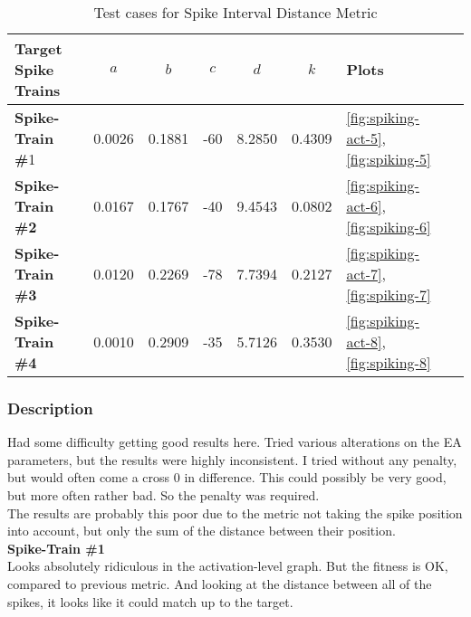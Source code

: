 \begin{table}[H]
	\begin{center}
		\begin{tabular}{ | l | c | c | c | c | c | l | l |}
	
	    \hline

			\textbf{Target Spike Trains} & \textbf{$a$} & \textbf{$b$} & \textbf{$c$} & \textbf{$d$} & \textbf{$k$} & \textbf{Plots}  \\ \hline 
			\textbf{Spike-Train \#}1 & 0.0026 & 0.1881 & -60 & 8.2850 & 0.4309 & \autoref{fig:spiking-act-5}, \autoref{fig:spiking-5} \\ \hline 
			\textbf{Spike-Train \#2} & 0.0167 & 0.1767 & -40 & 9.4543 & 0.0802 & \autoref{fig:spiking-act-6}, \autoref{fig:spiking-6} \\ \hline 
			\textbf{Spike-Train \#3} & 0.0120 & 0.2269 & -78 & 7.7394 & 0.2127 & \autoref{fig:spiking-act-7}, \autoref{fig:spiking-7} \\ \hline 
			\textbf{Spike-Train \#4} & 0.0010 & 0.2909 & -35 & 5.7126 & 0.3530 & \autoref{fig:spiking-act-8}, \autoref{fig:spiking-8}    \\ \hline 

	    \end{tabular}
	
	\end{center}
    \caption{Test cases for Spike Interval Distance Metric}
\end{table}

\subsubsection{Description}

Had some difficulty getting good results here. Tried various alterations on the EA parameters,
but the results were highly inconsistent. I tried without any penalty, but would often come
a cross 0 in difference. This could possibly be very good, but more often rather bad. So the penalty
was required. \\

The results are probably this poor due to the metric not taking the spike position into account, but
only the sum of the distance between their position. \\

\textbf{Spike-Train \#1} \\
Looks absolutely ridiculous in the activation-level graph. But the fitness is OK, compared to previous metric. 
And looking at the distance between all of the spikes, it looks like it could match up to the target. \\

